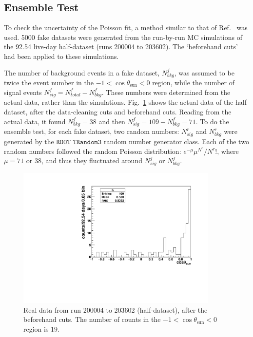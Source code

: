 \subsection{Ensemble Test}\label{sect:ensemble}

To check the uncertainty of the Poisson fit, a method similar to that of Ref.~\cite{leta} was used. 5000 fake datasets were generated from the run-by-run MC simulations of the 92.54 live-day half-dataset (runs 200004 to 203602). The `beforehand cuts' had been applied to these simulations.

The number of background events in a fake dataset, $N^f_{bkg}$, was assumed to be twice the event number in the $-1<\cos\theta_\mathrm{sun}<0$ region, while the number of signal events $N^f_{sig}=N^f_{total}-N^f_{bkg}$. These numbers were determined from the actual data, rather than the simulations. Fig.~\ref{half_data} shows the actual data of the half-dataset, after the data-cleaning cuts and beforehand cuts. Reading from the actual data, it found $N^f_{bkg}=38$ and then $N^f_{sig}=109-N^f_{bkg}=71$. To do the ensemble test, for each fake dataset, two random numbers: $N^r_{sig}$ and $N^r_{bkg}$ were generated by the $\texttt{ROOT TRandom3}$ random number generator class. Each of the two random numbers followed the random Poisson distribution: $e^{-\mu}\mu^{N^r}/N^r!$, where $\mu=71$ or $38$, and thus they fluctuated around $N^f_{sig}$ or $N^f_{bkg}$.

\begin{figure}[!htb]
	\centering
	\includegraphics[width=10cm]{cosThetaToSun_halfData_5to15.pdf}
	\caption[Real data from run 200004 to 203602, after the beforehand cuts.]{Real data from run 200004 to 203602 (half-dataset), after the beforehand cuts. The number of counts in the $-1<\cos\theta_\mathrm{sun}<0$ region is 19. \label{half_data}}
\end{figure}

